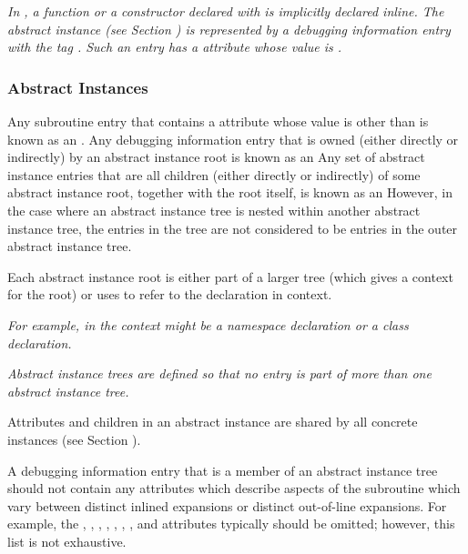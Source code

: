 \textit{In , a function or a constructor declared with
 is implicitly declared inline. The abstract
instance (see Section ) 
is represented by a debugging information
entry with the tag \DWTAGsubprogram. Such an entry has a
\DWATinline{} attribute whose value is \DWINLinlined.}

\subsubsection{Abstract Instances}
\label{chap:abstractinstances}
Any subroutine entry that contains a
\DWATinlineDEFN{} attribute 
whose value is other than 
\DWINLnotinlined{}
is known as an .
\hypertarget{chap:DWATinlineabstracttinstance}{}
Any debugging information entry that is owned (either
directly or indirectly) by an abstract instance root
is known as an 
Any set of abstract instance entries that are all
children (either directly or indirectly) of some abstract
instance root, together with the root itself, is known as an
However, in the case where an abstract instance tree is 
nested within another abstract instance tree, the entries in the 
tree are not considered to be entries in the outer abstract
instance tree.

Each abstract instance root is either part of a larger
tree (which gives a context for the root) or 
uses
\DWATspecification{} 
to refer to the declaration in context.

\textit{For example, in  the context might be a namespace
declaration or a class declaration.}

\textit{Abstract instance trees are defined so that no entry is part
of more than one abstract instance tree.}

Attributes and children in an abstract instance are shared
by all concrete instances (see Section ).

A debugging information entry that is a member of an abstract
instance tree should not contain any attributes which describe
aspects of the subroutine which vary between distinct inlined
expansions or distinct out-of-line expansions. For example,
the \DWATlowpc,
\DWAThighpc, 
\DWATranges, 
\DWATentrypc, 
\DWATlocation,
\DWATreturnaddr, 
\DWATstartscope, 
and 
\DWATsegment{}
attributes 
typically 
should 
be 
omitted; 
however, 
this 
list
is not exhaustive.

